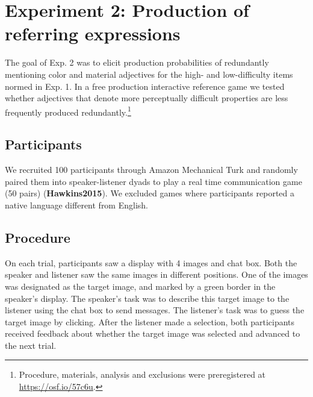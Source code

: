 \documentclass[12pt,letterpaper]{article}
\newcommand{\citeA}{\textbf}
\begin{document}
\section{Experiment 2: Production of referring expressions} 

The goal of Exp. 2 was to elicit production probabilities of redundantly mentioning color and material adjectives for the high- and low-difficulty items normed in Exp. 1. In a free production interactive reference game we tested whether adjectives that denote more perceptually difficult properties are less frequently produced redundantly.\footnote{Procedure, materials, analysis and exclusions were preregistered at \href {https://osf.io/57c6u}{https://osf.io/57c6u}.}

\subsection{Participants} 

We recruited 100 participants through Amazon Mechanical Turk and randomly paired them into speaker-listener dyads to play a real time communication game (50 pairs) (\citeA{Hawkins2015}). We excluded games where participants reported a native language different from English.

\subsection{Procedure} 

On each trial, participants saw a display with 4 images and chat box. Both the speaker and listener saw the same images in different positions. One of the images was designated as the target image, and marked by a green border in the speaker's display. The speaker's task was to describe this target image to the listener using the chat box to send messages. The listener's task was to guess the target image by clicking. After the listener made a selection, both participants received feedback about whether the target image was selected and advanced to the next trial. 
\end{document}
